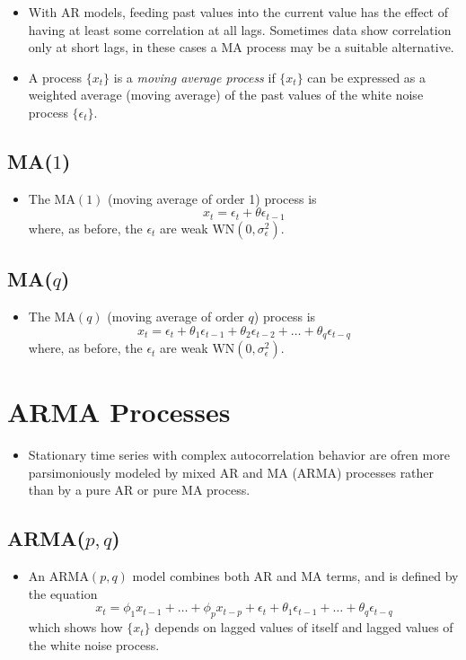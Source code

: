 \documentclass[11pt]{article}
\begin{document}
\begin{itemize}
    \item With AR models, feeding past values into the current value has the effect of having 
    at least some correlation at all lags. Sometimes data show correlation only at short lags, 
    in these cases a MA process may be a suitable alternative.
    \item A process $\{x_t\}$ is a \textit{moving average process} if $\{x_t\}$ can be 
    expressed as a weighted average (moving average) of the past values of the white noise 
    process $\{\epsilon_t\}$.
\end{itemize}

\subsection{MA($1$)}
\begin{itemize}
    \item The $\text{MA}(1)$ (moving average of order 1) process is 
    \[x_t = \epsilon_t + \theta \epsilon_{t-1}\]
    where, as before, the $\epsilon_t$ are weak $\text{WN}(0, \sigma_{\epsilon}^{2})$.
\end{itemize}

\subsection{MA($q$)}
\begin{itemize}
    \item The $\text{MA}(q)$ (moving average of order $q$) process is 
    \[x_t = \epsilon_t + \theta_1 \epsilon_{t-1} + \theta_2 \epsilon_{t-2} + \hdots + \theta_q \epsilon_{t-q} \]
    where, as before, the $\epsilon_t$ are weak $\text{WN}(0, \sigma_{\epsilon}^{2})$.
\end{itemize}

\section{ARMA Processes}
\begin{itemize}
    \item Stationary time series with complex autocorrelation behavior are ofren more 
    parsimoniously modeled by mixed AR and MA (ARMA) processes rather than by a pure AR or pure
    MA process.
\end{itemize}

\subsection{ARMA($p,q$)}
\begin{itemize}
    \item An $\text{ARMA}(p,q)$ model combines both AR and MA terms, and is defined by the 
    equation 
    \[x_t = \phi_1 x_{t-1} + \hdots + \phi_p x_{t-p} + \epsilon_t + \theta_1 \epsilon_{t-1} + 
    \hdots + \theta_q \epsilon_{t-q}\]
    which shows how $\{x_t\}$ depends on lagged values of itself and lagged values of the white
    noise process.
\end{itemize}
\end{document}
